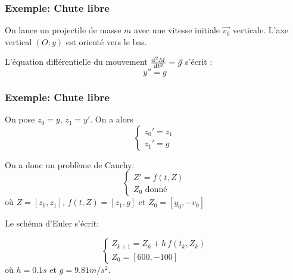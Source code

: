 \documentclass{beamer}
\def \de {{\rm d}}
\begin{document}
 
 \begin{frame}
 \frametitle{Exemple: Chute libre}
  On lance un projectile de masse $m$ avec une vitesse initiale $\vec{v_0}$ verticale. L'axe vertical $(O;y)$ est orienté vers le bas.
\begin{center}
 \end{center}

 L'équation différentielle du mouvement $\frac{\de^2 M}{\de t^2}=\vec g$ s'écrit  : 
  \[
  y''=g
\]
  
  \end{frame}
 \begin{frame}
 \frametitle{Exemple: Chute libre}
  

  On pose $z_0=y$, $z_1=y'$. On a alors
  \[\left\{\begin{array}{l}
  z_0'=z_1\\
  z_1'=g
  \end{array}\right.\]
  
     On a donc un problème de Cauchy:
  \[\left\{\begin{array}{l}
  Z'=f(t,Z)\\
  Z_0 \mbox{ donné}
  \end{array}\right.\]
  où $Z=[z_0,z_1]$, $f(t,Z)=[z_1,g]$ et $Z_0=[y_0,-v_0]$
  
  Le schéma d'Euler s'écrit:
  
  \[\left\{\begin{array}{l}
  Z_{k+1}=Z_k+h\,f(t_k,Z_k)\\
  Z_0 =[600,-100]
  \end{array}\right.\]
  où $h=0.1s$ et $g=9.81 m/s^2$.
  
  \end{frame}
\end{document}
